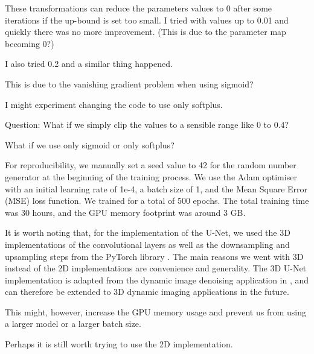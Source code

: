 \documentclass[12pt]{article}
\begin{document}
These transformations can reduce the parameters values to 0 after some iterations if the up-bound is set too small.
I tried with values up to 0.01 and quickly there was no more improvement. (This is due to the parameter map becoming 0?)

I also tried 0.2 and a similar thing happened.

This is due to the vanishing gradient problem when using sigmoid?

I might experiment changing the code to use only softplus.

Question: What if we simply clip the values to a sensible range like 0 to 0.4?

What if we use only sigmoid or only softplus?

For reproducibility, we manually set a seed value to 42 for the random number generator at the beginning of the training process. We use the Adam optimiser with an initial learning rate of 1e-4, a batch size of 1, and the Mean Square Error (MSE) loss function. We trained for a total of 500 epochs. The total training time was 30 hours, and the GPU memory footprint was around 3 GB.

It is worth noting that, for the implementation of the U-Net, 
we used the 3D implementations of the convolutional layers as well as the downsampling and upsampling steps from the PyTorch library \cite{PyTorch}.
The main reasons we went with 3D instead of the 2D implementations are convenience and generality.
The 3D U-Net implementation is adapted from the dynamic image denoising application in \cite{kofler2023learning}, and can therefore be extended to 3D dynamic imaging applications in the future.

This might, however, increase the GPU memory usage and prevent us from using a larger model or a larger batch size.

Perhaps it is still worth trying to use the 2D implementation.




\end{document}
